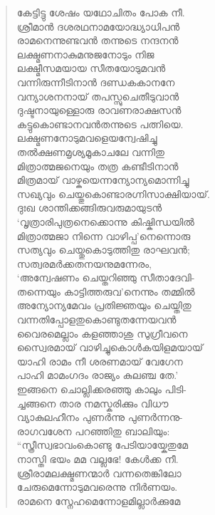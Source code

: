 \begin{verse}
കേട്ടിട്ടു ശേഷം യഥോചിതം പോക നീ.\\
ശ്രീമാന്‍ ദശരഥനാമയോദ്ധ്യാധിപന്‍\\
രാമനെന്നുണ്ടവന്‍ തന്നുടെ നന്ദനന്‍\\
ലക്ഷ്മണനാകുമനുജനോടും നിജ\\
ലക്ഷ്മീസമയായ സീതയോടുമവന്‍\\
വന്നിരുന്നീടിനാന്‍ ദണ്ഡകകാനനേ\\
വന്യാശനനായ് തപസ്സുചെതീടുവാന്‍\\
ദുഷ്ടനായുള്ളൊരു രാവണരാക്ഷസന്‍\\
കട്ടുകൊണ്ടാനവന്‍തന്നുടെ പത്നിയെ.\\
ലക്ഷ്മണനോടുമവളെയന്വേഷിച്ചു\\
തല്‍ക്ഷണമൃശ്യമൂകാചലേ വന്നിതു\\
മിത്രാത്മജനെയും തത്ര കണ്ടീടിനാന്‍\\
മിത്രമായ് വാഴ്കയെന്നന്യോന്യമൊന്നിച്ചു\\
സഖ്യവും ചെയ്തുകൊണ്ടാരഗ്നിസാക്ഷിയായ്.\\
ദുഃഖ ശാന്തിക്കങ്ങിരുവരുമായുടന്‍\\
‘വൃത്രാരിപുത്രനെക്കൊന്നു കിഷ്കിന്ധയില്‍\\
മിത്രാത്മജാ നിന്നെ വാഴിപ്പ’നെന്നൊരു\\
സത്യവും ചെയ്തുകൊടുത്തിതു രാഘവന്‍;\\
സത്വരമര്‍ക്കതനയനുമന്നേരം,\\
‘അന്വേഷണം ചെയ്തറിഞ്ഞു സീതാദേവി-\\
തന്നെയും കാട്ടിത്തരുവ’നെന്നും തമ്മില്‍\\
അന്യോന്യമേവം പ്രതിജ്ഞയും ചെയ്തിതു\\
വന്നതിപ്പോളതുകൊണ്ടുതന്നേയവന്‍\\
വൈരമെല്ലാം കളഞ്ഞാശു സുഗ്രീവനെ\\
സ്വൈരമായ് വാഴിച്ചുകൊള്‍കയിളമയായ്\\
യാഹി രാമം നീ ശരണമായ് വേഗേന\\
പാഹി മാമംഗദം രാജ്യം കുലഞ്ച തേ.’\\
ഇങ്ങനെ ചൊല്ലിക്കരഞ്ഞു കാലും പിടി-\\
ച്ചങ്ങനെ താര നമസ്കരിക്കും വിധൗ\\
വ്യാകുലഹീനം പുണര്‍ന്നു പുണര്‍ന്നനു-\\
രാഗവശേന പറഞ്ഞിതു ബാലിയും:\\
“സ്ത്രീസ്വഭാവംകൊണ്ടു പേടിയായ്കേതുമേ\\
നാസ്തി ഭയം മമ വല്ലഭേ! കേള്‍ക്ക നീ.\\
ശ്രീരാമലക്ഷ്മണന്മാര്‍ വന്നതെങ്കിലോ\\
ചേരുമെന്നോടുമവരെന്നു നിര്‍ണയം.\\
രാമനെ സ്നേഹമെന്നോളമില്ലാര്‍ക്കുമേ\\

\end{verse}
